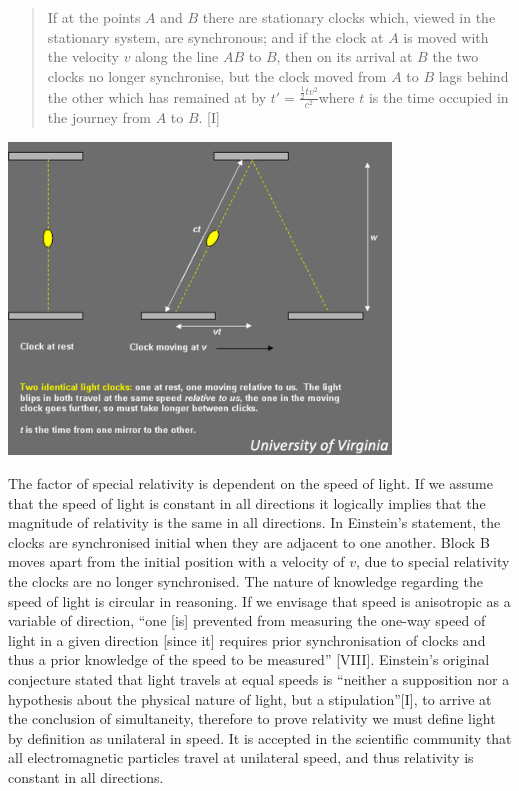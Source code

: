 \documentclass[12pt,letterpaper]{article}
\begin{document}
\hangindent
\begin{quote} 
If at the points $A$ and $B$ there are stationary clocks which, viewed in the stationary system, are synchronous; and if the clock at $A$ is moved with the velocity $v$ along the line $AB$ to $B$, then on its arrival at $B$ the two clocks no longer synchronise, but the clock moved from $A$ to $B$ lags behind the other which has remained at by $t'=\frac{\frac{1}{2} tv^2}{c^2}$where $t$  is the time occupied in the journey from $A$ to $B$. [I]
\end{quote} 
\begin{center}
    \includegraphics[width=4in]{Screenshot 2022-05-07 at 23.36.34.png}
\end{center}
The factor of special relativity is dependent on the speed of light. If we assume that the speed of light is constant in all directions it logically implies that the magnitude of relativity is the same in all directions. In Einstein's statement, the clocks are synchronised initial when they are adjacent to one another. Block B moves apart from the initial position with a velocity of $v$, due to special relativity the clocks are no longer synchronised. The nature of knowledge regarding the speed of light is circular in reasoning. If we envisage that speed is anisotropic as a variable of direction, “one [is] prevented from measuring the one-way speed of light in a given direction [since it] requires prior synchronisation of clocks and thus a prior knowledge of the speed to be measured” [VIII]. Einstein's original conjecture stated that light travels at equal speeds is “neither a supposition nor a hypothesis about the physical nature of light, but a stipulation”[I], to arrive at the conclusion of simultaneity, therefore to prove relativity we must define light by definition as unilateral in speed. It is accepted in the scientific community that all electromagnetic particles travel at unilateral speed, and thus relativity is constant in all directions. 
\end{document}
